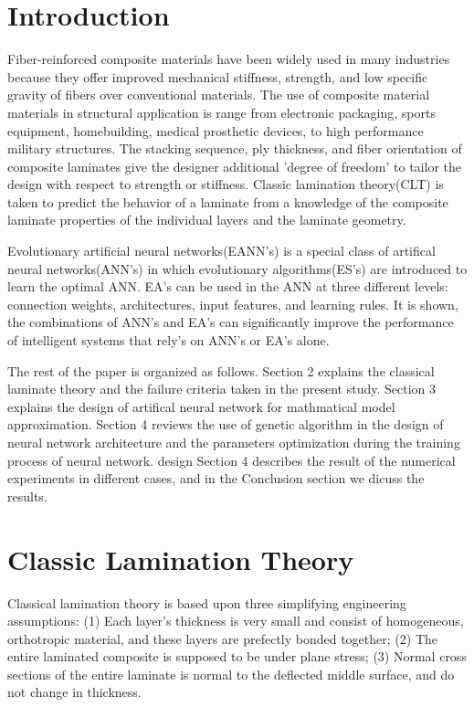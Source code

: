 \section{Introduction}
Fiber-reinforced composite materials have been widely used in many industries
because they offer improved mechanical stiffness, strength, and low specific
gravity of fibers  over conventional materials. The use of composite material
materials in structural application is range from electronic packaging, sports
equipment, homebuilding, medical prosthetic devices, to high performance
military structures. The stacking sequence, ply thickness, and fiber
orientation of composite laminates give the designer additional ’degree of
freedom’ to tailor the design with respect to strength or stiffness. Classic
lamination theory(CLT) is taken to predict the behavior of a laminate from a
knowledge of the composite laminate properties of the individual layers and the
laminate geometry.

Evolutionary artificial neural networks(EANN's) is a special class of artifical
neural networks(ANN's) in which evolutionary algorithms(ES's) are introduced to
learn the optimal ANN. EA's can be used in the ANN at three different levels:
connection weights, architectures, input features, and learning rules. It is
shown, the combinations of ANN's and EA's can significantly improve the
performance of intelligent systems that rely's on ANN's or EA's alone.



The rest of the paper is organized as follows. Section 2 explains the classical
laminate theory and the failure criteria taken in the present study. Section 3
explains the design of artifical neural network for mathmatical model
approximation.  Section 4 reviews the use of genetic algorithm in the design of
neural network architecture and the parameters optimization during the training
process of neural network.  design Section 4 describes the result of the
numerical experiments in different cases, and in the Conclusion section we
dicuss the results.
\section{Classic Lamination Theory}
Classical lamination theory is based upon three simplifying engineering
assumptions: (1) Each layer's thickness is very small and consist of
homogeneous, orthotropic material, and these layers are prefectly bonded
together; (2) The entire laminated composite is supposed to be under plane
stress; (3) Normal cross sections of the entire laminate is normal to the
deflected middle surface, and do not change in thickness.

